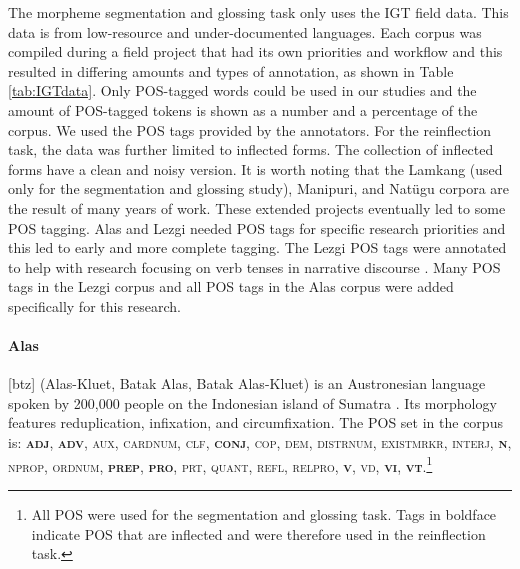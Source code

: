 The morpheme segmentation and glossing task only uses the IGT field data. This data is from low-resource and under-documented languages. Each corpus was compiled during a field project that had its own priorities and workflow and this resulted in differing amounts and types of annotation, as shown in Table \ref{tab:IGTdata}. Only POS-tagged words could be used in our studies and the amount of POS-tagged tokens is shown as a number and a percentage of the corpus. We used the POS tags provided by the annotators. For the reinflection task, the data was further limited to inflected forms. The collection of inflected forms have a clean and noisy version.
It is worth noting that the Lamkang (used only for the segmentation and glossing study), Manipuri, and Nat\"ugu corpora are the result of many years of work. These extended projects eventually led to some POS tagging. Alas and Lezgi needed POS tags for specific research priorities and this led to early and more complete tagging. The Lezgi POS tags were annotated to help with research focusing on verb tenses in narrative discourse \citep{donet_importance_2014}. Many POS tags in the Lezgi corpus and all POS tags in the Alas corpus were added specifically for this research. 

\paragraph{Alas} 
[btz] (Alas-Kluet, Batak Alas, Batak Alas-Kluet) is an Austronesian language spoken by 200,000 people on the Indonesian island of Sumatra \cite{eberhard_ethnologue:2020}. Its morphology features reduplication, infixation, and circumfixation. The POS set in the corpus is: \textsc{\textbf{adj}, \textbf{adv}, aux, cardnum, clf, \textbf{conj}, cop, dem, distrnum, existmrkr, interj, \textbf{n}, nprop, ordnum, \textbf{prep}, \textbf{pro}, prt, quant, refl, relpro, \textbf{v}, vd, \textbf{vi}, \textbf{vt}}.\footnote{All POS were used for the segmentation and glossing task. Tags in boldface indicate POS that are inflected and were therefore used in the reinflection task.}

